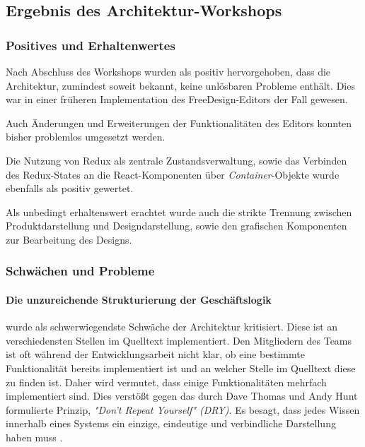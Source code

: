 \subsection{Ergebnis des Architektur-Workshops}

\subsubsection{Positives und Erhaltenwertes}
Nach Abschluss des Workshops wurden als positiv hervorgehoben, dass die Architektur, zumindest soweit bekannt, keine unlösbaren Probleme enthält. 
Dies war in einer früheren Implementation des FreeDesign-Editors der Fall gewesen.

Auch Änderungen und Erweiterungen der Funktionalitäten des Editors konnten bisher problemlos umgesetzt werden.

Die Nutzung von Redux als zentrale Zustandsverwaltung, sowie das Verbinden des Redux-States an die React-Komponenten über \emph{Container}-Objekte wurde ebenfalls als positiv gewertet. 

Als unbedingt erhaltenswert erachtet wurde auch die strikte Trennung zwischen Produktdarstellung und Designdarstellung, sowie den grafischen Komponenten zur Bearbeitung des Designs. 


\subsubsection{Schwächen und Probleme}
\paragraph{Die unzureichende Strukturierung der Geschäftslogik}
wurde als schwerwiegendste Schwäche der Architektur kritisiert.
Diese ist an verschiedensten Stellen im Quelltext implementiert. Den Mitgliedern des Teams ist oft während der Entwicklungsarbeit nicht klar, ob eine bestimmte Funktionalität bereits implementiert ist und an welcher Stelle im Quelltext diese zu finden ist. 
Daher wird vermutet, dass einige Funktionalitäten mehrfach implementiert sind. 
Dies verstößt gegen das durch Dave Thomas und Andy Hunt formulierte Prinzip, \emph{"Don’t Repeat Yourself" (DRY)}. Es besagt, dass jedes Wissen innerhalb eines Systems ein einzige, eindeutige und verbindliche Darstellung haben muss \autocite[vgl.][30 - 31]{ThomasAndHunt2020}. 


